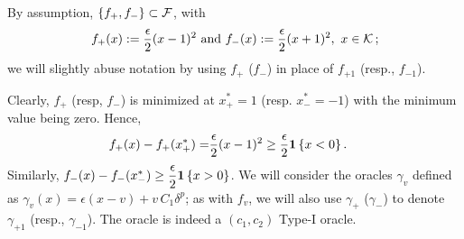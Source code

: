 
By assumption,  $\{f_+, f_-\}\subset \mathcal{F}$, with 
\begin{align*}
  f_+(x) := \dfrac{\epsilon}{2} (x - 1)^2 \text{ and } f_-(x) := \dfrac{\epsilon}{2} (x + 1)^2, \,\, x \in \mathcal{K}\,;
\end{align*}
we will slightly abuse notation by using $f_+$ ($f_-$) in place of $f_{+1}$ (resp., $f_{-1}$).

Clearly, $f_+$ (resp, $f_-$) is minimized at $x^*_+ = 1$ (resp. $x^*_- = -1$) with the minimum value being zero.
Hence, 
\begin{align}
  f_+(x) - f_+(x^*_+)
  = &  \dfrac{\epsilon}{2} (x - 1)^2 \ge  \dfrac{\epsilon}{2}  \mathbf{1}\left\{x  < 0\right\}. \label{eq:fv-lb}
\end{align}
Similarly,   $f_-(x) - f_-(x^*_-) \ge  \dfrac{\epsilon}{2}  \mathbf{1}\left\{x  >0\right\}$.
We will consider the oracles $\gamma_v$ defined as 
$\gamma_v(x) = \epsilon(x-v) + v\, C_1 \delta^p$; as with $f_v$, we will also use $\gamma_{+}$ ($\gamma_-$) 
to denote $\gamma_{+1}$ (resp., $\gamma_{-1}$).
The oracle is indeed a $(c_1,c_2)$ Type-I oracle.

